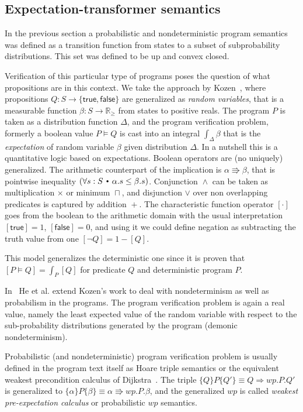 \documentclass{eptcs}
\theoremstyle{plain}
\theoremstyle{definition}
\newcommand{\Real}{\ensuremath{\mathbb R}}
\newcommand{\RealPos}{\ensuremath{\Real_\geq}}
\newcommand{\lit}[1]{\ensuremath{\mathit{#1}}}
\newcommand{\ra}{\ensuremath{\rightarrow}}
\newcommand{\dotsep}{\mbox{\raisebox{0.4ex}{\tiny\ensuremath{\:\;\bullet\;\:}}}}
\newcommand{\Not}{\ensuremath{\neg}}
\newcommand{\Wp}{\lit{wp}}
\newcommand{\True}[0]{\textsf{true}}
\newcommand{\False}[0]{\textsf{false}}
\newcommand{\elq}{\ensuremath{\Rrightarrow}}
\begin{document}
\subsection{Expectation-transformer semantics} \label{sec:expct-trans_semantic}

In the previous section a probabilistic and nondeterministic program semantics was defined as a transition function from states to a subset of subprobability distributions.
This set was defined to be up and convex closed.

Verification of this particular type of programs poses the question of what propositions are in this context.
We take the approach by Kozen~\cite{kozen83pdl}, where propositions $Q: S\ra \{\True,\False\}$ are generalized as \emph{random variables}, that is a measurable function $\beta:S\ra \RealPos$ from states to positive reals.
The program $P$ is taken as a distribution function $\Delta$, and the program verification problem, formerly a boolean value $P\models Q$ is cast into an integral $\int_\Delta \beta$ that is the \emph{expectation} of random variable $\beta$ given distribution $\Delta$.
In a nutshell this is a quantitative logic based on expectations.
Boolean operators are (no uniquely) generalized.
The arithmetic counterpart of the implication is $\alpha\elq\beta$, that is pointwise inequality $(\forall s:S \dotsep \alpha.s\leq\beta.s)$.
Conjunction ${}\land{}$ can be taken as multiplication $\times$ or minimum ${}\sqcap{}$, and disjunction $\lor$ over non overlapping predicates is captured by addition ${}+{}$.
The characteristic function operator $[\cdot]$ goes from the boolean to the arithmetic domain with the usual interpretation $[\True]=1$, $[\False]=0$, and using it we could define negation as subtracting the truth value from one $[\Not Q]=1-[Q]$.

This model generalizes the deterministic one since it is proven that $[P\models Q] = \int_P [Q]$ for predicate $Q$ and deterministic program $P$.

In~\cite{he97models} He et al. extend Kozen's work to deal with nondeterminism as well as probabilism in the programs.
The program verification problem is again a real value, namely the least expected value of the random variable with respect to the sub-probability distributions generated by the program (demonic nondeterminism).

Probabilistic (and nondeterministic) program verification problem is usually defined in the program text itself as Hoare triple semantics or the equivalent weakest precondition calculus of Dijkstra~\cite{kozen83pdl,morgan04arp}.
The triple $\{Q\}P\{Q'\} \equiv Q\Rightarrow \Wp.P.Q'$ is generalized to $\{\alpha\}P\{\beta\} \equiv \alpha\elq\Wp.P.\beta$, and the generalized $\Wp$ is called \emph{weakest pre-expectation calculus} or probabilistic $\Wp$ semantics.
\end{document}
